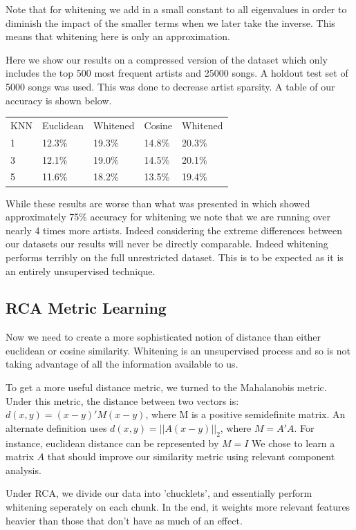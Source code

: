 \documentclass[a4paper,10pt]{article}
\begin{document}
Note that for whitening we add in a small constant to all eigenvalues in order to diminish the impact of the smaller terms when we later take the inverse. This means that whitening here is only an approximation. 

Here we show our results on a compressed version of the dataset which only includes the top 500 most frequent artists and 25000 songs. A holdout test set of 5000 songs was used. This was done to decrease artist sparsity. A table of our accuracy is shown below.
\begin{center}
\begin{tabular}{lllll}
KNN & Euclidean & Whitened & Cosine & Whitened\\
1 & 12.3\% & 19.3\% & 14.8\% & 20.3\%\\
3 & 12.1\% & 19.0\% & 14.5\% & 20.1\% \\
5 & 11.6\% & 18.2\% & 13.5\% & 19.4\% 
\end{tabular}
\end{center}
While these results are worse than what was presented in \cite{Slaney_learninga} which showed approximately 75\% accuracy for whitening we note that we are running over nearly 4 times more artists. Indeed considering the extreme differences between our datasets our results will never be directly comparable. Indeed whitening performs terribly on the full unrestricted dataset. This is to be expected as it is an entirely unsupervised technique.
\subsection{RCA Metric Learning}
Now we need to create a more sophisticated notion of distance than either euclidean or cosine similarity. Whitening is an unsupervised process and so is not taking advantage of all the information available to us. 

To get a more useful distance metric, we turned to the Mahalanobis metric. Under this metric, the distance between two vectors is: $d(x,y)=(x-y)'M(x-y)$, where M is a positive semidefinite matrix. An alternate definition uses $d(x,y)=||A(x-y)||_2$, where $M=A'A$. For instance, euclidean distance can be represented by $M=I$
We chose to learn a matrix $A$ that should improve our similarity metric using relevant component analysis.

Under RCA, we divide our data into 'chucklets', and essentially perform whitening seperately on each chunk. In the end, it weights more relevant features heavier than those that don't have as much of an effect.
\end{document}

